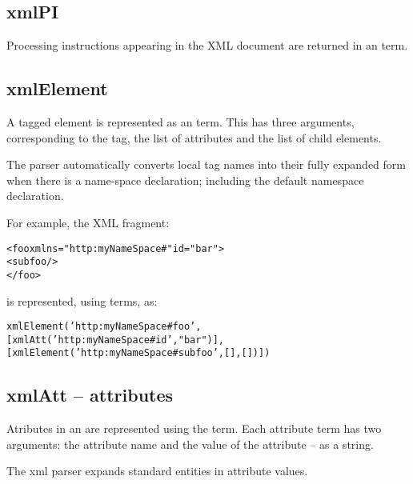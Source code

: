 \subsection{xmlPI}
\label{xml:xmlPI}
Processing instructions appearing in the XML document are returned in an  term.

\subsection{xmlElement}
\label{xml:xmlElement}
A tagged element is represented as an  term. This has three arguments, corresponding to the tag, the list of attributes and the list of child elements.

The parser automatically converts local tag names into their fully expanded form when there is a name-space declaration; including the default namespace declaration.

For example, the XML fragment:
\begin{alltt}
<foo xmlns="http:myNameSpace#" id="bar">
  <subfoo/>
</foo>
\end{alltt}
is represented, using  terms, as:
\begin{alltt}
xmlElement('http:myNameSpace#foo',
  [xmlAtt('http:myNameSpace#id',"bar")],
  [xmlElement('http:myNameSpace#subfoo',[],[])])
\end{alltt}

\subsection{xmlAtt -- attributes}
\label{xml:xmlAtt}
Atributes in an  are represented using the  term. Each attribute  term has two arguments: the attribute name and the value of the attribute -- as a string.

The \go xml parser expands standard entities in attribute values.

